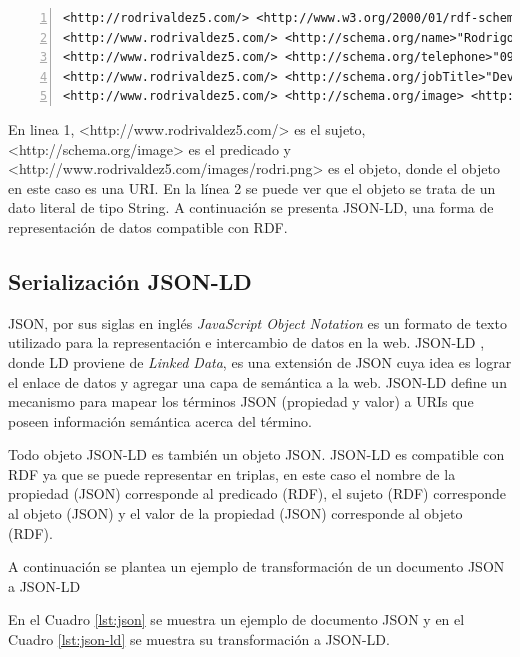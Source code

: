 \noindent\begin{minipage}{\textwidth}
\begin{lstlisting}[captionpos=b, caption=Ejemplo en RDF/N-Quads, label=lst:n-quads,  numbers=left,  numberstyle=\tiny\color{mygray},frame=single]
<http://rodrivaldez5.com/> <http://www.w3.org/2000/01/rdf-schema#type> <http://schema.org/person> .  
<http://www.rodrivaldez5.com/> <http://schema.org/name>"Rodrigo Valdez" .
<http://www.rodrivaldez5.com/> <http://schema.org/telephone>"0981530572" .
<http://www.rodrivaldez5.com/> <http://schema.org/jobTitle>"Developer" .
<http://www.rodrivaldez5.com/> <http://schema.org/image> <http://www.rodrivaldez5.com/images/rodri.png> .
\end{lstlisting}
\end{minipage}

En linea 1, <http://www.rodrivaldez5.com/> es el sujeto, <http://schema.org/image>  es el predicado y <http://www.rodrivaldez5.com/images/rodri.png>  es el objeto, donde el objeto en este caso es una URI. En la línea 2 se puede ver que el objeto se trata de un dato literal de tipo String.  A continuación se presenta JSON-LD, una forma de representación de datos compatible con RDF.

\subsection{Serialización JSON-LD}

JSON, por sus siglas en inglés \textit{JavaScript Object Notation} es un formato de texto utilizado para la representación e intercambio de datos en la web. JSON-LD \cite{JSONLDSy39:online}, donde LD proviene de \textit{Linked Data}, es una extensión de JSON cuya idea es lograr el enlace de datos y agregar una capa de semántica a la web. JSON-LD define un mecanismo para mapear los términos JSON (propiedad y valor) a URIs que poseen información semántica acerca del término. 

Todo objeto JSON-LD es también un objeto JSON. JSON-LD es compatible con RDF ya que se puede representar en triplas, en este caso el nombre de la propiedad (JSON) corresponde al predicado (RDF), el sujeto (RDF) corresponde al objeto (JSON) y el valor de la propiedad (JSON) corresponde al objeto (RDF).

A continuación se plantea un ejemplo de transformación de un documento JSON a JSON-LD 

En el Cuadro \ref{lst:json} se muestra un ejemplo de documento JSON y en el Cuadro \ref{lst:json-ld} se muestra su transformación a JSON-LD.  
\newline

